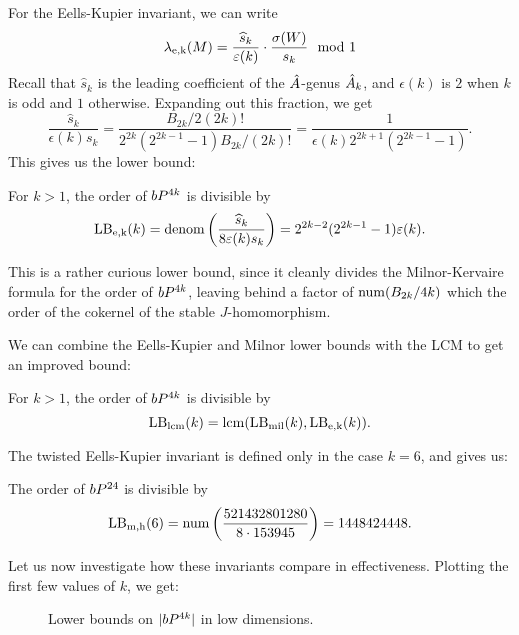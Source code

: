 For the Eells-Kupier invariant, we can write
\[
	\lambda_{\mathrm{e,k}}(M) = \frac{\widehat{s}_k}{\varepsilon(k)}\cdot \frac{\sigma(W)}{s_k} \mod 1
\]
Recall that $\widehat{s}_k$ is the leading coefficient of the $\hat{A}$-genus $\hat{A}_k$, and $\epsilon(k)$ is $2$ when $k$ is odd and $1$ otherwise. Expanding out this fraction, we get
\[
	\frac{\widehat{s}_k}{\epsilon(k)s_k} = \frac{B_{2k}/2(2k)!}{2^{2k}(2^{2k-1}-1)B_{2k}/(2k)!} = \frac{1}{\epsilon(k) 2^{2k+1}(2^{2k-1}-1)}.
\]
This gives us the lower bound:
\begin{proposition}\label{prop:eells-kupier-lower-bound}
	For $k>1$, the order of $bP^{4k}$ is divisible by
	\[
		\mathrm{LB}_{\mathrm{e,k}}(k)=\operatorname{denom}\left(\frac{\widehat{s}_k}{8\varepsilon(k)s_k}\right) = 2^{2k-2}(2^{2k-1}-1)\varepsilon(k).
	\]
\end{proposition}
This is a rather curious lower bound, since it cleanly divides the Milnor-Kervaire formula for the order of $bP^{4k}$, leaving behind a factor of $\operatorname{num}(B_{2k}/4k)$ which the order of the cokernel of the stable $J$-homomorphism.

We can combine the Eells-Kupier and Milnor lower bounds with the LCM to get an improved bound:

\begin{proposition}\label{prop:lcm-lower-bound}
	For $k>1$, the order of $bP^{4k}$ is divisible by \[\mathrm{LB}_{\mathrm{lcm}}(k)=\operatorname{lcm}(\mathrm{LB}_{\mathrm{mil}}(k),\mathrm{LB}_{\mathrm{e,k}}(k)).\]
\end{proposition}

The twisted Eells-Kupier invariant is defined only in the case $k=6$, and gives us:
\begin{proposition}\label{prop:twisted-eells-kupier-lower-bound}
	The order of $bP^{24}$ is divisible by
	\[
		\mathrm{LB}_{\mathrm{m,h}}(6) = \operatorname{num}\left(\frac{521432801280}{8\cdot 153945}\right) = 1448424448.
	\]
\end{proposition}

Let us now investigate how these invariants compare in effectiveness. Plotting the first few values of $k$, we get: 

\begin{figure}[ht]
	\centering
{}
\caption{Lower bounds on $|bP^{4k}|$ in low dimensions.}
\end{figure}


